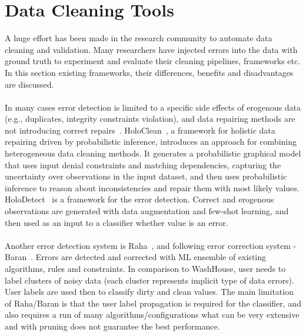 \section{Data Cleaning Tools}
A huge effort has been made in the research community to automate data cleaning and validation. 
Many researchers have injected errors into the data with ground truth to experiment and evaluate their cleaning pipelines, frameworks etc.
In this section existing frameworks, their differences, benefits and disadvantages are discussed.\\\\
In many cases error detection is limited to a specific side effects of erogenous data (e.g., duplicates, integrity constraints violation), and data repairing methods are not introducing correct repairs~\cite{holoclean}. 
HoloClean~\cite{holoclean}, a framework for holistic data repairing driven by probabilistic inference, introduces an approach for combining heterogeneous data cleaning methods.
It generates a probabilistic graphical model that uses input denial constraints and matching dependencies, capturing the uncertainty over observations in the input dataset, and then uses probabilistic inference to reason about inconsistencies and repair them with most likely values. 
HoloDetect~\cite{holodetect} is a framework for the error detection. Correct and erogenous observations are generated with data augmentation and few-shot learning, and then used as an input to a classifier whether value is an error.\\\\
Another error detection system is Raha~\cite{raha}, and following error correction system - Baran~\cite{baran}. Errors are detected and corrected with ML ensemble of existing algorithms, rules and constraints.
In comparison to WashHouse, user needs to label clusters of noisy data (each cluster represents implicit type of data errors). User labels are used then to classify dirty and clean values. 
The main limitation of Raha/Baran is that the user label propagation is required for the classifier, and also requires a run of many algorithms/configurations what can be very extensive and with pruning does not guarantee the best performance.\\\\
